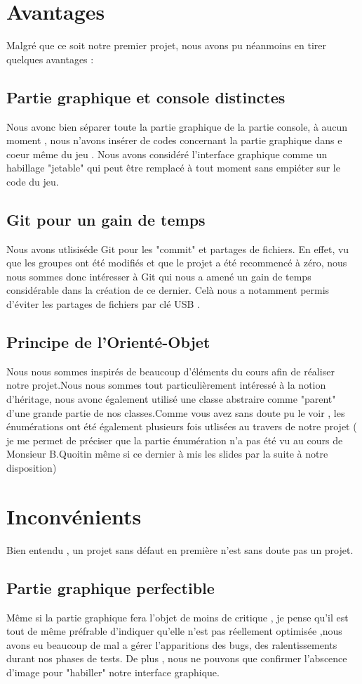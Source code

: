 \documentclass[10pt]{article}
\begin{document}
\section{Avantages}
Malgré que ce soit notre premier projet, nous avons pu néanmoins en tirer quelques avantages :
\subsection{Partie graphique et console distinctes}
Nous avonc bien séparer toute la partie graphique de la partie console, à aucun moment , nous n'avons insérer de codes concernant la partie  graphique dans e coeur même du jeu . Nous avons considéré l'interface graphique comme un habillage "jetable" qui peut être remplacé à tout moment sans empiéter sur le code du jeu.
\subsection{Git pour un gain de temps }
 Nous avons utlisiséde Git pour les "commit" et partages de fichiers. En effet, vu que les groupes ont été modifiés et que le projet a été recommencé à zéro, nous nous sommes donc intéresser à Git qui nous a amené un gain de temps considérable dans la création de ce dernier.
Celà nous a notamment permis d'éviter les partages de fichiers par clé USB .

\subsection{Principe de l'Orienté-Objet}
Nous nous sommes inspirés de beaucoup d'éléments du cours afin de réaliser notre projet.Nous nous sommes tout particulièrement intéressé à la notion d'héritage, nous avonc également utilisé une classe abstraire comme "parent" d'une grande partie de nos classes.Comme vous avez sans doute pu le voir , les énumérations ont été également plusieurs fois utlisées au travers de notre projet ( je me permet de préciser que la partie énumération n'a pas été vu au cours de Monsieur B.Quoitin même si ce dernier à mis les slides par la suite à notre disposition) 

 
\section{Inconvénients}
Bien entendu , un projet sans défaut en première n'est sans doute pas un projet.
\subsection{Partie graphique perfectible}
 Même si la partie graphique fera l'objet de moins de critique , je pense qu'il est tout de même préfrable d'indiquer qu'elle n'est pas réellement optimisée ,nous avons eu beaucoup de mal a gérer l'apparitions des bugs, des ralentissements durant nos phases de tests.
De plus , nous ne pouvons que confirmer l'abscence d'image pour "habiller" notre interface graphique.
\end{document}
